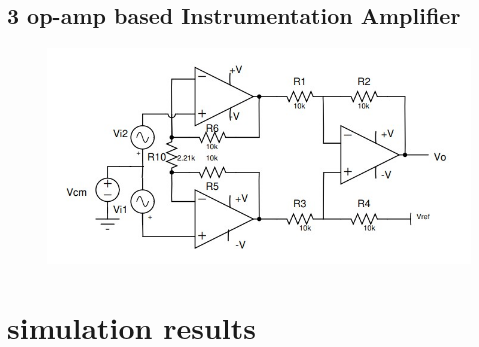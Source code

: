 \documentclass[12pt]{article}
\begin{document}
\subsection{3 op-amp based Instrumentation Amplifier}
\begin{figure}[h!]
\centering
\includegraphics[scale=1]{circuit2.jpg}
\end{figure}
\newpage

\section{simulation results}
\end{document}
